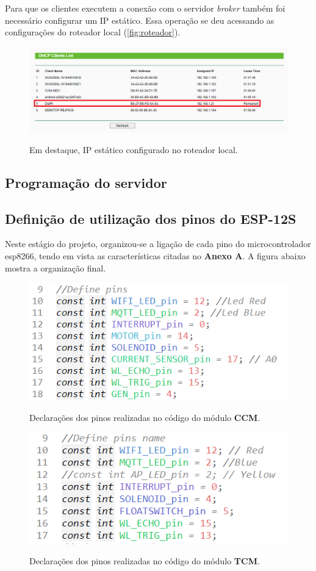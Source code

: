 Para que os clientes executem a conexão com o servidor \textit{broker} também foi necessário configurar um IP estático. Essa operação se deu acessando as configurações do roteador local (\autoref{fig:roteador}).

\begin{figure}[H]
	\centering
	\caption{Em destaque, IP estático configurado no roteador local.}
	\includegraphics[width=1
	\textwidth]{figuras/ip_estatico_rasp.png}
	\label{fig:roteador}
\end{figure}



\subsection {Programação do servidor}
\subsection {Definição de utilização dos pinos do ESP-12S}

Neste estágio do projeto, organizou-se a ligação de cada pino do microcontrolador esp8266, tendo em vista as características citadas no \textbf{Anexo A}. A figura abaixo mostra a organização final.

\begin{figure}[H]
	\centering
	\caption{Declarações dos pinos realizadas no código do módulo \textbf{CCM}.}
	\includegraphics[width=0.5
	\textwidth]{figuras/pinos_definicao_ccm2.png}
	\label{fig:definicao_pinos_ccm}
\end{figure}

\begin{figure}[H]
	\centering
	\caption{Declarações dos pinos realizadas no código do módulo \textbf{TCM}.}
	\includegraphics[width=0.5
	\textwidth]{figuras/pinos_definicao_tcm.png}
	\label{fig:definicao_pinos_tcm}
\end{figure}


